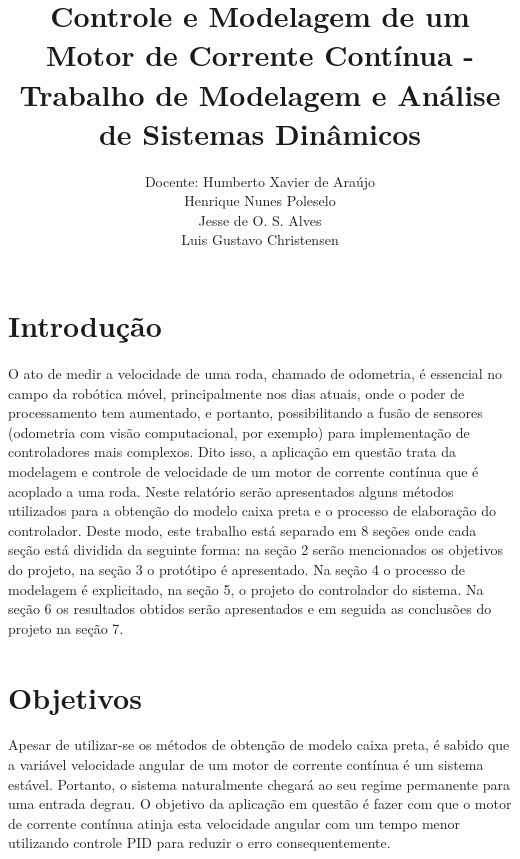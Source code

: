 \documentclass{article}
\title{Controle e Modelagem de um Motor de Corrente Contínua - Trabalho de Modelagem e Análise de Sistemas Dinâmicos}
\author{
  Docente: Humberto Xavier de Araújo \\
  \And
  Henrique Nunes Poleselo \\
   \And
 Jesse de O. S. Alves \\
  \And
  Luis Gustavo Christensen
}
\begin{document}
\maketitle

\section{Introdução}

O ato de medir a velocidade de uma roda, chamado de odometria, é essencial no campo da robótica móvel, principalmente nos dias atuais, onde o poder de processamento tem aumentado, e portanto, possibilitando a fusão de sensores (odometria com visão computacional, por exemplo) para implementação de controladores mais complexos. Dito isso, a aplicação em questão trata da modelagem e controle de velocidade de um motor de corrente contínua que é acoplado a uma roda. Neste relatório serão apresentados alguns métodos utilizados para a obtenção do modelo caixa preta e o processo de elaboração do controlador.
Deste modo, este trabalho está separado em 8 seções onde cada seção está dividida da seguinte forma: na seção 2 serão mencionados os objetivos do projeto, na seção 3 o protótipo é apresentado. Na seção 4 o processo de modelagem é explicitado, na seção 5, o projeto do controlador do sistema. Na seção 6 os resultados obtidos serão apresentados e em seguida as conclusões do projeto na seção 7. 


\section{Objetivos}
Apesar de utilizar-se os métodos de obtenção de modelo caixa preta, é sabido que a variável velocidade angular de um motor de corrente contínua é um sistema estável. Portanto, o sistema naturalmente chegará ao seu regime permanente para uma entrada degrau. O objetivo da aplicação em questão é fazer com que o motor de corrente contínua atinja esta velocidade angular com um tempo menor utilizando controle PID para reduzir o erro consequentemente.
\end{document}
